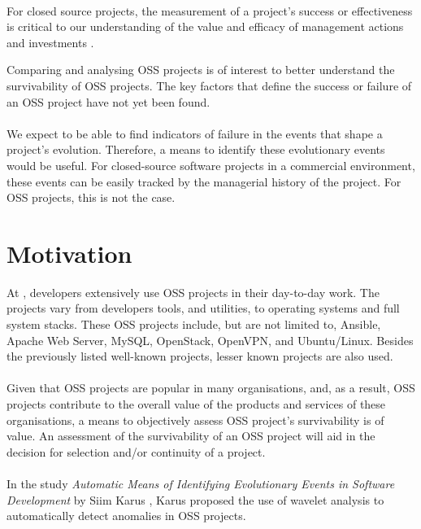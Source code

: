 \paragraph{}
For closed source projects, the measurement of a project's success or
effectiveness is critical to our understanding of the value and efficacy of
management actions and investments \cite{delone2003}.

Comparing and analysing OSS projects is of interest to better understand the
survivability of OSS projects. The key factors that define the success or
failure of an OSS project have not yet been found.

\paragraph{}
We expect to be able to find indicators of failure in the events that
shape a project's evolution. Therefore, a means to identify these evolutionary
events would be useful. For closed-source software projects in a commercial
environment, these events can be easily tracked by the managerial history of
the project. For OSS projects, this is not the case.



\section{Motivation}
At \hostOrg, developers extensively use OSS projects in their day-to-day
work. The projects vary from developers tools, and utilities, to operating
systems and full system stacks. These OSS projects include, but are not limited
to, Ansible, Apache Web Server, MySQL, OpenStack, OpenVPN, and Ubuntu/Linux.
Besides the previously listed well-known projects, lesser known projects are
also used.

\paragraph{}
Given that OSS projects are popular in many organisations, and, as a result,
OSS projects contribute to the overall value of the products and services of
these organisations, a means to objectively assess OSS project's survivability
is of value. An assessment of the survivability of an OSS project will aid in
the decision for selection and/or continuity of a project.

\paragraph{}
In the study \emph{Automatic Means of Identifying Evolutionary Events in
Software Development }\rm by Siim Karus \cite{karus2013}, Karus proposed the
use of wavelet analysis to automatically detect anomalies in OSS projects.

